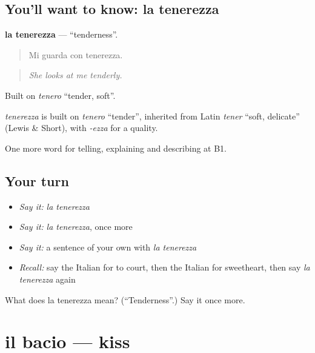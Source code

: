 \subsection*{You'll want to know: la tenerezza}
\textbf{la tenerezza} — \textquotedblleft{}tenderness\textquotedblright{}.

\begin{quote}
Mi guarda con tenerezza.
\end{quote}

\begin{quote}
\emph{She looks at me tenderly.}
\end{quote}

Built on \emph{tenero} \textquotedblleft{}tender, soft\textquotedblright{}.

\begin{cousinweb}
\emph{tenerezza} is built on \emph{tenero} \textquotedblleft{}tender\textquotedblright{}, inherited from Latin \emph{tener} \textquotedblleft{}soft, delicate\textquotedblright{} (Lewis \& Short), with \emph{-ezza} for a quality.
\end{cousinweb}

\begin{grammarlens}[title={What you've built}]
One more word for telling, explaining and describing at B1.
\end{grammarlens}

\subsection*{Your turn}
\begin{itemize}
\raggedright
  \item \emph{Say it:} \emph{la tenerezza}
  \item \emph{Say it:} \emph{la tenerezza}, once more
  \item \emph{Say it:} a sentence of your own with \emph{la tenerezza}
  \item \emph{Recall:} say the Italian for to court, then the Italian for sweetheart, then say \emph{la tenerezza} again
\end{itemize}

\begin{tcolorbox}[breakable,colback=teal!4,colframe=teal!35!black,title={Before you move on}]
What does la tenerezza mean? (\textquotedblleft{}Tenderness\textquotedblright{}.) Say it once more.
\end{tcolorbox}
\section[il bacio]{il bacio — kiss}

